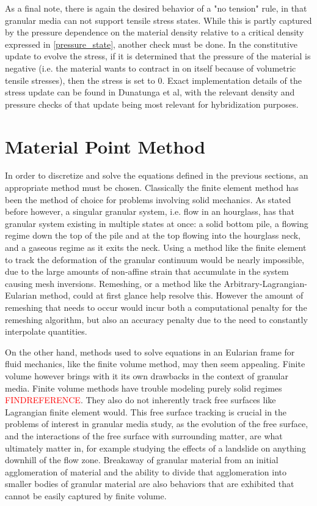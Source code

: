 As a final note, there is again the desired behavior of a "no tension" rule, in that granular media can not support tensile stress states. While this is partly captured by the pressure dependence on the material density relative to a critical density expressed in \ref{pressure_state}, another check must be done. In the constitutive update to evolve the stress, if it is determined that the pressure of the material is negative (i.e. the material wants to contract in on itself because of volumetric tensile stresses), then the stress is set to 0. Exact implementation details of the stress update can be found in Dunatunga et al, with the relevant density and pressure checks of that update being most relevant for hybridization purposes. 

\section{Material Point Method}
In order to discretize and solve the equations defined in the previous sections, an appropriate method must be chosen. Classically the finite element method has been the method of choice for problems involving solid mechanics. As stated before however, a singular granular system, i.e. flow in an hourglass, has that granular system existing in multiple states at once: a solid bottom pile, a flowing regime down the top of the pile and at the top flowing into the hourglass neck, and a gaseous regime as it exits the neck. Using a method like the finite element to track the deformation of the granular continuum would be nearly impossible, due to the large amounts of non-affine strain that accumulate in the system causing mesh inversions. Remeshing, or a method like the Arbitrary-Lagrangian-Eularian method, could at first glance help resolve this. However the amount of remeshing that needs to occur would incur both a computational penalty for the remeshing algorithm, but also an accuracy penalty due to the need to constantly interpolate quantities.

On the other hand, methods used to solve equations in an Eularian frame for fluid mechanics, like the finite volume method, may then seem appealing. Finite volume however brings with it its own drawbacks in the context of granular media. Finite volume methods have trouble modeling purely solid regimes \textcolor{red}{FINDREFERENCE}. They also do not inherently track free surfaces like Lagrangian finite element would. This free surface tracking is crucial in the problems of interest in granular media study, as the evolution of the free surface, and the interactions of the free surface with surrounding matter, are what ultimately matter in, for example studying the effects of a landslide on anything downhill of the flow zone. Breakaway of granular material from an initial agglomeration of material and the ability to divide that agglomeration into smaller bodies of granular material are also behaviors that are exhibited that cannot be easily captured by finite volume.

